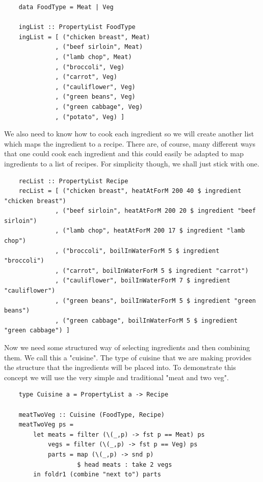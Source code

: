 \documentclass[11pt]{article}
\begin{document}
\begin{lstlisting}
    data FoodType = Meat | Veg

    ingList :: PropertyList FoodType
    ingList = [ ("chicken breast", Meat)
              , ("beef sirloin", Meat)
              , ("lamb chop", Meat)
              , ("broccoli", Veg)
              , ("carrot", Veg)
              , ("cauliflower", Veg)
              , ("green beans", Veg)
              , ("green cabbage", Veg)
              , ("potato", Veg) ]
\end{lstlisting}

We also need to know how to cook each ingredient so we will create another
list which maps the ingredient to a recipe. There are, of course, many different
ways that one could cook each ingredient and this could easily be adapted to
map ingredients to a list of recipes. For simplicity though, we shall just
stick with one.

\begin{lstlisting}
    recList :: PropertyList Recipe
    recList = [ ("chicken breast", heatAtForM 200 40 $ ingredient "chicken breast")
              , ("beef sirloin", heatAtForM 200 20 $ ingredient "beef sirloin")
              , ("lamb chop", heatAtForM 200 17 $ ingredient "lamb chop")
              , ("broccoli", boilInWaterForM 5 $ ingredient "broccoli")
              , ("carrot", boilInWaterForM 5 $ ingredient "carrot")
              , ("cauliflower", boilInWaterForM 7 $ ingredient "cauliflower")
              , ("green beans", boilInWaterForM 5 $ ingredient "green beans")
              , ("green cabbage", boilInWaterForM 5 $ ingredient "green cabbage") ]
\end{lstlisting}

Now we need some structured way of selecting ingredients and then combining
them. We call this a "cuisine". The type of cuisine that we are making provides
the structure that the ingredients will be placed into. To demonstrate this
concept we will use the very simple and traditional "meat and two veg".

\begin{lstlisting}
    type Cuisine a = PropertyList a -> Recipe

    meatTwoVeg :: Cuisine (FoodType, Recipe)
    meatTwoVeg ps =
        let meats = filter (\(_,p) -> fst p == Meat) ps
            vegs = filter (\(_,p) -> fst p == Veg) ps
            parts = map (\(_,p) -> snd p)
                    $ head meats : take 2 vegs
        in foldr1 (combine "next to") parts
\end{lstlisting}
\end{document}
